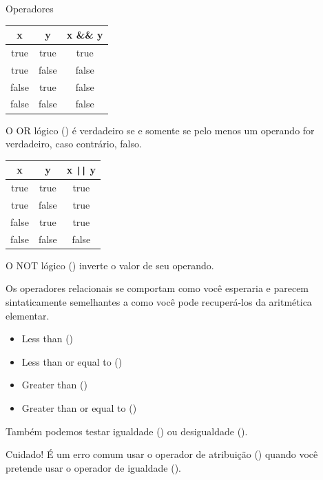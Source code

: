 \documentclass{beamer}
\begin{document}
\begin{frame}{Operadores}
  \begin{center}
    \begin{tabular}{ccc}
      x & y & x \&\& y\\
      \hline
      true & true & true\\
      true & false & false\\
      false & true & false\\
      false & false & false\\ \hline
    \end{tabular}
  \end{center}

  \framebreak

  O OR lógico (\ilcode{\|\|}) é verdadeiro se e somente se pelo menos um
  operando for verdadeiro, caso contrário, falso.

  \begin{center}
    \begin{tabular}{ccc}
      x & y & x \verb#||# y\\
      \hline
      true & true & true\\
      true & false & true\\
      false & true & true\\
      false & false & false\\ \hline
    \end{tabular}
  \end{center}

  O NOT lógico (\ilcode{!}) inverte o valor de seu operando.

  \framebreak

  Os operadores relacionais se comportam como você esperaria e parecem
  sintaticamente semelhantes a como você pode recuperá-los da
  aritmética elementar.

  \begin{itemize}
  \item Less than ()
  \item Less than or equal to ()
  \item Greater than ()
  \item Greater than or equal to ()
  \end{itemize}

  \framebreak

  Também podemos testar igualdade () ou desigualdade
  ().

  {\color{red} Cuidado}! É um erro comum usar o operador de atribuição
  (\ilcode{=}) quando você pretende usar o operador de igualdade
  (\ilcode{==}).
  
\end{frame}
\end{document}
